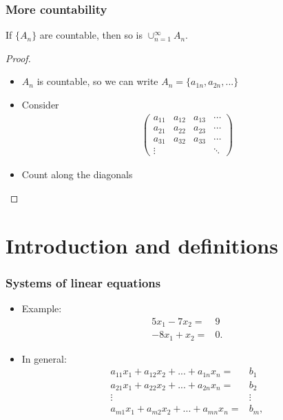 \documentclass[compress]{beamer}
\begin{document}
\begin{frame}
  \frametitle{More countability}
  \begin{theorem}
    If $\{A_n\}$ are countable, then so is $\cup_{n=1}^\infty A_n$.
  \end{theorem}
  \begin{proof}
    \begin{itemize}
    \item $A_n$ is countable, so we can write $A_n = \{a_{1n}, a_{2n},
      ...\}$ 
    \item Consider 
      \begin{align*}
        \begin{pmatrix} 
          a_{11} & a_{12} & a_{13} & \cdots \\
          a_{21} & a_{22} & a_{23} & \cdots \\
          a_{31} & a_{32} & a_{33} & \cdots \\          
          \vdots &      &       & \ddots
        \end{pmatrix}
      \end{align*}
    \item Count along the diagonals
    \end{itemize}
  \end{proof}  
\end{frame}


\section{Introduction and definitions}
\begin{frame} 
  \frametitle{Systems of linear equations}
  \begin{itemize} 
  \item Example:
    \begin{align*}
      5 x_1 - 7 x_2 = & 9 \\
      -8 x_1 + x_2 = & 0.
    \end{align*}
  \item In general:
    \begin{align*}
      a_{11} x_1 + a_{12} x_2 + ... + a_{1n} x_n = & b_1 \\
      a_{21} x_1 + a_{22} x_2 + ... + a_{2n} x_n = & b_2 \\
      \vdots & \vdots \\
      a_{m1} x_1 + a_{m2} x_2 + ... + a_{mn} x_n = & b_m ,
    \end{align*}
  \end{itemize}
\end{frame}
\end{document}
